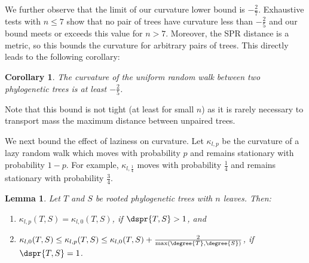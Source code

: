 \documentclass{amsart}
\newtheorem{lemma}[theorem]{Lemma}
\newtheorem{corollary}[theorem]{Corollary}
\begin{document}
We further observe that the limit of our curvature lower bound is $-\frac{2}{7}$.
Exhaustive tests with $n \le 7$ show that no pair of trees have curvature less than $-\frac{2}{5}$ and our bound meets or exceeds this value for $n > 7$.
Moreover, the SPR distance is a metric, so this bounds the curvature for arbitrary pairs of trees.
This directly leads to the following corollary:

\begin{corollary}
	The curvature of the uniform random walk between two phylogenetic trees is at least $-\frac{2}{5}$.
\end{corollary}

Note that this bound is not tight (at least for small $n$) as it is rarely necessary to transport mass the maximum distance between unpaired trees.

We next bound the effect of laziness on curvature. Let $\kappa_{l,p}$ be the curvature of a lazy random walk which moves with probability $p$ and remains stationary with probability $1 - p$.
For example, $\kappa_{l,\frac{1}{4}}$ moves with probability $\frac{1}{4}$ and remains stationary with probability $\frac{3}{4}$. 

\begin{lemma}
	Let $T$ and $S$ be rooted phylogenetic trees with $n$ leaves.
	Then:
	\begin{enumerate}
		\item	$\kappa_{l,p}(T,S) = \kappa_{l,0}(T,S)$, if $\dspr{T,S} > 1$, and
		\item	$\kappa_{l,0}(T,S) \le \kappa_{l,p}(T,S) \le \kappa_{l,0}(T,S) + \frac{2}{\max(\degree{T}, \degree{S})}$, if $\dspr{T,S} = 1$.
	\end{enumerate}
\end{lemma}
\end{document}
